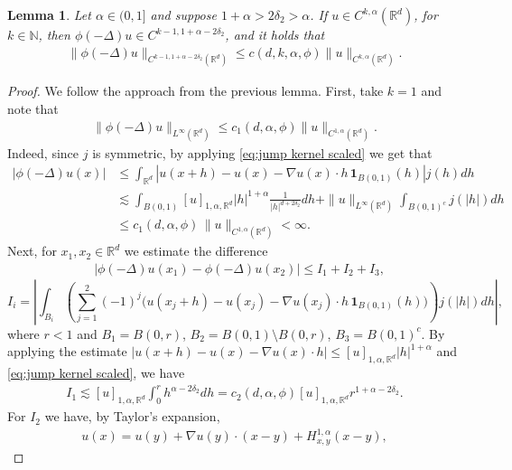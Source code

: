 \documentclass[12pt,a4paper,onecolumn]{amsart}
\newtheorem{lem}[thm]{Lemma}
\theoremstyle{definition}
\newcommand{\R}{\mathbb{R}}
\newcommand{\N}{\mathbb{N}}
\newcommand{\1}{\mathbf 1}
\newcommand{\LoR}{\phi(-\Delta)}
\numberwithin{equation}{section}
\begin{document}
\begin{lem}\label{l:reg. 1,alpha}
	Let $\alpha\in(0,1]$ and suppose $1+\alpha>2\delta_2>\alpha$. If $u\in C^{k,\alpha}(\R^d)$, for $k\in \N$, then $\LoR u\in C^{k-1,1+\alpha-2\delta_2}$, and it holds that
    \begin{align}\label{eq:reg. 1,alpha}
        \|\LoR u\|_{C^{k-1,1+\alpha-2\delta_2}(\R^d)}\le c(d,k,\alpha,\phi)\|u\|_{C^{k,\alpha}(\R^d)}. 
    \end{align}
\end{lem}

\begin{proof}
	We follow the approach from the previous lemma. First, take $k=1$ and note that
 \begin{align}\label{eq:LoR bounded no2}
     \| \LoR u\|_{L^\infty(\R^d)}\le c_1(d,\alpha,\phi) \| u\|_{C^{1,\alpha}(\R^d)}.
 \end{align}
 Indeed, since $j$ is symmetric, by applying \eqref{eq:jump kernel scaled} we get that
 \begin{align*}
        |\LoR u(x)|
        &\le \int_{\R^d}|u(x+h)-u(x)-\nabla u(x)\cdot h \,\1_{B(0,1)}(h)|j(h)dh \\ 
        &\lesssim \int_{B(0,1)}[u]_{1,\alpha,\R^d}|h|^{1+\alpha}\frac{1}{|h|^{d+2\delta_2}}dh+\|u\|_{L^\infty(\R^d)}\int_{B(0,1)^c}j(|h|)dh\\
        &\le c_1(d,\alpha,\phi)\,\|u\|_{C^{1,\alpha}(\R^d)}<\infty.
\end{align*}
Next, for $x_1,x_2\in\R^d$ we estimate the difference
 \begin{align*}
        &|\LoR u(x_1)-\LoR u(x_2)|\le I_1+I_2+I_3,
    \end{align*}
\[
        I_i=\left|\int_{B_i}\left(\sum_{j=1}^2 (-1)^j {\big(}u(x_j+h)-u(x_j)-\nabla u(x_j)\cdot h\,\1_{B(0,1)}(h){\big)}\right)j(|h|)dh\right|,
\]
where $r<1$ and $B_1=B(0,r)$, $B_2=B(0,1)\setminus B(0,r)$, $B_3=B(0,1)^c$. By applying the estimate $|u(x+h)-u(x)-\nabla u(x)\cdot h|\le [u]_{1,\alpha,\R^d}|h|^{1+\alpha}$ and  \eqref{eq:jump kernel scaled}, we have
\begin{align}\label{eq:reg. 1,alpha no1}
    I_1\lesssim [u]_{1,\alpha,\R^d}\int_0^r h^{\alpha-2\delta_2}dh=c_2(d,\alpha,\phi)[u]_{1,\alpha,\R^d}r^{1+\alpha-2\delta_2}.
\end{align}
For $I_2$ we have, by Taylor's expansion,
\begin{align}\label{eq:Taylors expansion Holder 1+alpha}
    u(x)=u(y)+\nabla u(y)\cdot({x-y})+H^{1,\alpha}_{x,y}({x-y}),
\end{align}

\end{proof}
\end{document}
